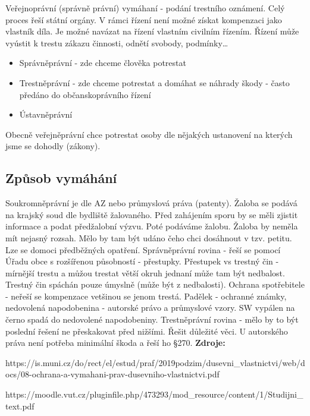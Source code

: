 Veřejnoprávní (správně právní) vymáhaní - podání trestního oznámení. Celý proces řeší státní orgány. V rámci řízení není možné získat kompenzaci jako vlastník díla. Je možné navázat na řízení vlastním civilním řízením. Řízení může vyústit k trestu zákazu činnosti, odnětí svobody, podmínky\dots
\begin{itemize}
    \item Správněprávní - zde chceme člověka potrestat
    \item Trestněprávní - zde chceme potrestat a domáhat se náhrady škody - často předáno do občanskoprávního řízení
    \item Ústavněprávní
\end{itemize}
Obecně veřejněprávní chce potrestat osoby dle nějakých ustanovení na kterých jsme se dohodly (zákony).

\subsection{Způsob vymáhání}
Soukromněprávní je dle AZ nebo průmyslová práva (patenty). Žaloba se podává na krajský soud dle bydliště žalovaného. Před zahájením sporu by se měli zjistit informace a podat předžalobní výzvu. Poté podáváme žalobu. Žaloba by neměla mít nejasný rozsah. Mělo by tam být udáno čeho chci dosáhnout v tzv. petitu. Lze se domoci předběžných opatření.\newline
Správněprávní rovina - řeší se pomocí Úřadu obce s rozšířenou působností - přestupky. Přestupek vs trestný čin - mírnější trestu a můžou trestat větší okruh jednaní může tam být nedbalost. Trestný čin spáchán pouze úmyslně (může být z nedbalosti). Ochrana spotřebitele - neřeší se kompenzace vetšinou se jenom trestá. Padělek - ochranné známky, nedovolená napodobenina - autorské právo a průmyslové vzory. SW vypálen na černo spadá do nedovolené napodobeniny.\newline
Trestněprávní rovina - mělo by to být poslední řešení ne přeskakovat před nižšími. Řešit důležité věci. U autorského práva není potřeba minimální škoda a řeší ho §270.
\newline\textbf{Zdroje:}

https://is.muni.cz/do/rect/el/estud/praf/2019podzim/dusevni_vlastnictvi/web/docs/08-ochrana-a-vymahani-prav-dusevniho-vlastnictvi.pdf

https://moodle.vut.cz/pluginfile.php/473293/mod_resource/content/1/Studijni_text.pdf

